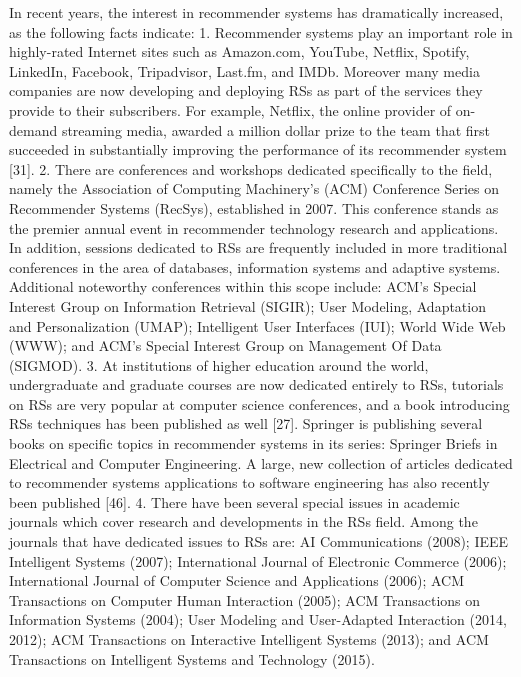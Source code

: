 In recent years, the interest in recommender systems has dramatically increased, as the following facts indicate:
1. Recommender systems play an important role in highly-rated Internet sites such as Amazon.com, YouTube, Netflix, Spotify, LinkedIn, Facebook, Tripadvisor, Last.fm, and IMDb. Moreover many media companies are now developing and deploying RSs as part of the services they provide to their subscribers. For example, Netflix, the online provider of on-demand streaming media, awarded a million dollar prize to the team that first succeeded in substantially improving the performance of its recommender system [31].
2. There are conferences and workshops dedicated specifically to the field, namely the Association of Computing Machinery’s (ACM) Conference Series on Recommender Systems (RecSys), established in 2007. This conference stands as the premier annual event in recommender technology research and applications. In addition, sessions dedicated to RSs are frequently included in more traditional conferences in the area of databases, information systems and adaptive systems. Additional noteworthy conferences within this scope include: ACM’s Special Interest Group on Information Retrieval (SIGIR); User Modeling, Adaptation and Personalization (UMAP); Intelligent User Interfaces (IUI); World Wide Web (WWW); and ACM’s Special Interest Group on Management Of Data (SIGMOD).
3. At institutions of higher education around the world, undergraduate and graduate courses are now dedicated entirely to RSs, tutorials on RSs are very popular at computer science conferences, and a book introducing RSs techniques has been published as well [27]. Springer is publishing several books on specific topics in recommender systems in its series: Springer Briefs in Electrical and Computer Engineering. A large, new collection of articles dedicated to recommender systems applications to software engineering has also recently been published [46].
4. There have been several special issues in academic journals which cover research and developments in the RSs field. Among the journals that have dedicated issues to RSs are: AI Communications (2008); IEEE Intelligent Systems (2007); International Journal of Electronic Commerce (2006); International Journal of Computer Science and Applications (2006); ACM Transactions on Computer Human Interaction (2005); ACM Transactions on Information Systems (2004); User Modeling and User-Adapted Interaction (2014, 2012); ACM Transactions on Interactive Intelligent Systems (2013); and ACM Transactions on Intelligent Systems and Technology (2015). ~\parencite{Ricci2015}


